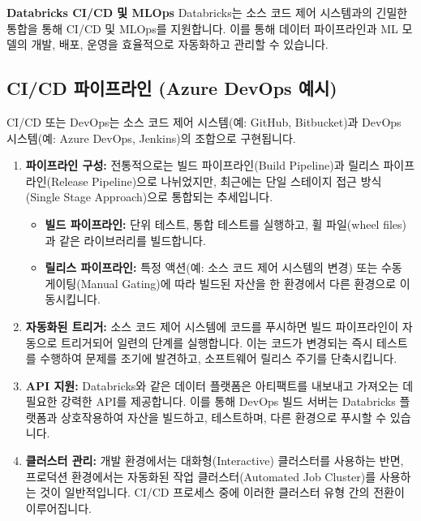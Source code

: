 \documentclass[11pt,a4paper]{article}
\begin{document}
\begin{conceptbox}
\textbf{Databricks CI/CD 및 MLOps}
Databricks는 소스 코드 제어 시스템과의 긴밀한 통합을 통해 CI/CD 및 MLOps를 지원합니다. 이를 통해 데이터 파이프라인과 ML 모델의 개발, 배포, 운영을 효율적으로 자동화하고 관리할 수 있습니다.
\end{conceptbox}

\subsection{CI/CD 파이프라인 (Azure DevOps 예시)}
CI/CD 또는 DevOps는 소스 코드 제어 시스템(예: GitHub, Bitbucket)과 DevOps 시스템(예: Azure DevOps, Jenkins)의 조합으로 구현됩니다.

\begin{enumerate}
    \item \textbf{파이프라인 구성:}
    전통적으로는 빌드 파이프라인(Build Pipeline)과 릴리스 파이프라인(Release Pipeline)으로 나뉘었지만, 최근에는 단일 스테이지 접근 방식(Single Stage Approach)으로 통합되는 추세입니다.
    \begin{itemize}
        \item \textbf{빌드 파이프라인:} 단위 테스트, 통합 테스트를 실행하고, 휠 파일(wheel files)과 같은 라이브러리를 빌드합니다.
        \item \textbf{릴리스 파이프라인:} 특정 액션(예: 소스 코드 제어 시스템의 변경) 또는 수동 게이팅(Manual Gating)에 따라 빌드된 자산을 한 환경에서 다른 환경으로 이동시킵니다.
    \end{itemize}

    \item \textbf{자동화된 트리거:}
    소스 코드 제어 시스템에 코드를 푸시하면 빌드 파이프라인이 자동으로 트리거되어 일련의 단계를 실행합니다. 이는 코드가 변경되는 즉시 테스트를 수행하여 문제를 조기에 발견하고, 소프트웨어 릴리스 주기를 단축시킵니다.

    \item \textbf{API 지원:}
    Databricks와 같은 데이터 플랫폼은 아티팩트를 내보내고 가져오는 데 필요한 강력한 API를 제공합니다. 이를 통해 DevOps 빌드 서버는 Databricks 플랫폼과 상호작용하여 자산을 빌드하고, 테스트하며, 다른 환경으로 푸시할 수 있습니다.

    \item \textbf{클러스터 관리:}
    개발 환경에서는 대화형(Interactive) 클러스터를 사용하는 반면, 프로덕션 환경에서는 자동화된 작업 클러스터(Automated Job Cluster)를 사용하는 것이 일반적입니다. CI/CD 프로세스 중에 이러한 클러스터 유형 간의 전환이 이루어집니다.
\end{enumerate}
\end{document}
